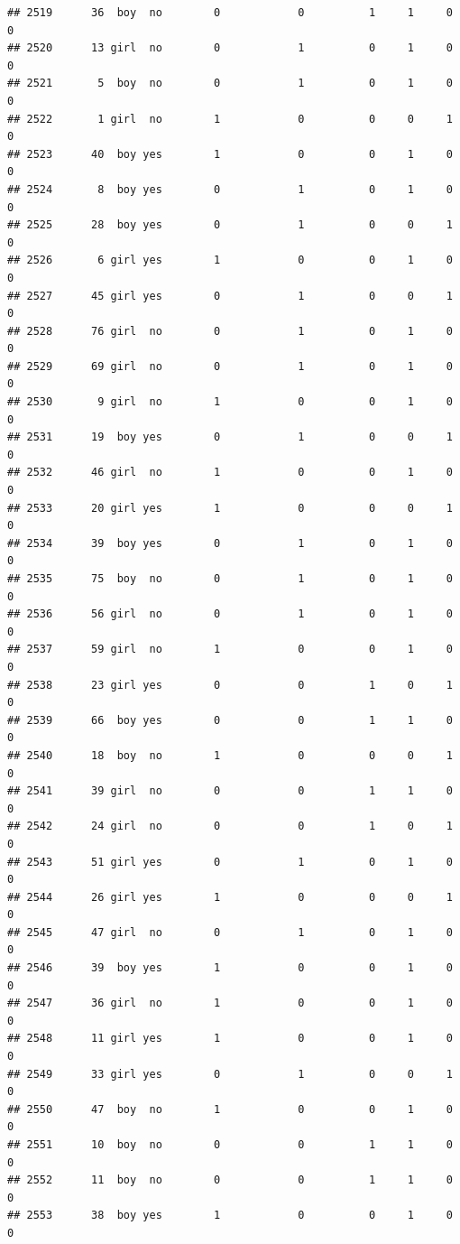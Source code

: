 \documentclass[man]{apa6}
\begin{document}
\begin{verbatim}
## 2519      36  boy  no        0            0          1     1     0     0
## 2520      13 girl  no        0            1          0     1     0     0
## 2521       5  boy  no        0            1          0     1     0     0
## 2522       1 girl  no        1            0          0     0     1     0
## 2523      40  boy yes        1            0          0     1     0     0
## 2524       8  boy yes        0            1          0     1     0     0
## 2525      28  boy yes        0            1          0     0     1     0
## 2526       6 girl yes        1            0          0     1     0     0
## 2527      45 girl yes        0            1          0     0     1     0
## 2528      76 girl  no        0            1          0     1     0     0
## 2529      69 girl  no        0            1          0     1     0     0
## 2530       9 girl  no        1            0          0     1     0     0
## 2531      19  boy yes        0            1          0     0     1     0
## 2532      46 girl  no        1            0          0     1     0     0
## 2533      20 girl yes        1            0          0     0     1     0
## 2534      39  boy yes        0            1          0     1     0     0
## 2535      75  boy  no        0            1          0     1     0     0
## 2536      56 girl  no        0            1          0     1     0     0
## 2537      59 girl  no        1            0          0     1     0     0
## 2538      23 girl yes        0            0          1     0     1     0
## 2539      66  boy yes        0            0          1     1     0     0
## 2540      18  boy  no        1            0          0     0     1     0
## 2541      39 girl  no        0            0          1     1     0     0
## 2542      24 girl  no        0            0          1     0     1     0
## 2543      51 girl yes        0            1          0     1     0     0
## 2544      26 girl yes        1            0          0     0     1     0
## 2545      47 girl  no        0            1          0     1     0     0
## 2546      39  boy yes        1            0          0     1     0     0
## 2547      36 girl  no        1            0          0     1     0     0
## 2548      11 girl yes        1            0          0     1     0     0
## 2549      33 girl yes        0            1          0     0     1     0
## 2550      47  boy  no        1            0          0     1     0     0
## 2551      10  boy  no        0            0          1     1     0     0
## 2552      11  boy  no        0            0          1     1     0     0
## 2553      38  boy yes        1            0          0     1     0     0

\end{verbatim}
\end{document}
